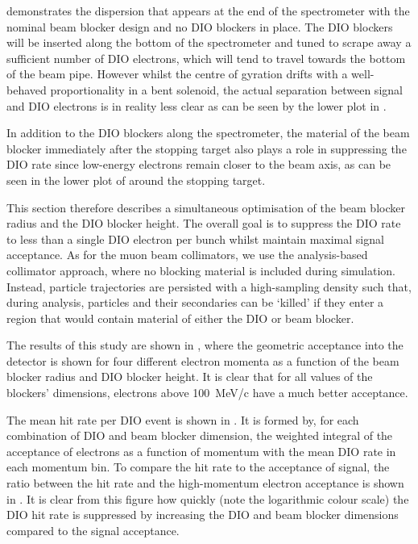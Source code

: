  demonstrates the dispersion that appears at the end of the spectrometer with the nominal beam blocker design and no DIO blockers in place.
The DIO blockers will be inserted along the bottom of the spectrometer and tuned to scrape away a sufficient number of DIO electrons, which will tend to travel towards the bottom of the beam pipe.
However whilst the centre of gyration drifts with a well-behaved proportionality in a bent solenoid, the actual separation between signal and \ac{DIO} electrons is in reality less clear as can be seen by the lower plot in .

In addition to the DIO blockers along the spectrometer, the material of the beam blocker immediately after the stopping target also plays a role in suppressing the \ac{DIO} rate since low-energy electrons remain closer to the beam axis, as can be seen in the lower plot of  around the stopping target.

This section therefore describes a simultaneous optimisation of the beam blocker radius and the DIO blocker height.
The overall goal is to suppress the DIO rate to less than a single DIO electron per bunch whilst maintain maximal signal acceptance.
As for the muon beam collimators, we use the analysis-based collimator approach, where no blocking material is included during simulation.
Instead, particle trajectories are persisted with a high-sampling density such that, during analysis, particles and their secondaries can be `killed' if they enter a region that would contain material of either the DIO or beam blocker.

\FigOptimDIOBeamBlockAcceptances
\FigOptimDIOBeamBlockHitRate
The results of this study are shown in , where the geometric acceptance into the detector is shown for four different electron momenta as a function of the beam blocker radius and DIO blocker height.
It is clear that for all values of the blockers' dimensions, electrons above 100~MeV/c have a much better acceptance.

The mean hit rate per DIO event is shown in .  
It is formed by, for each combination of DIO and beam blocker dimension, the weighted integral of the acceptance of electrons as a function of momentum with the mean DIO rate in each momentum bin.
To compare the hit rate to the acceptance of signal, the ratio between the hit rate and the high-momentum electron acceptance is shown in .
It is clear from this figure how quickly (note the logarithmic colour scale) the DIO hit rate is suppressed by increasing the DIO and beam blocker dimensions compared to the signal acceptance.

